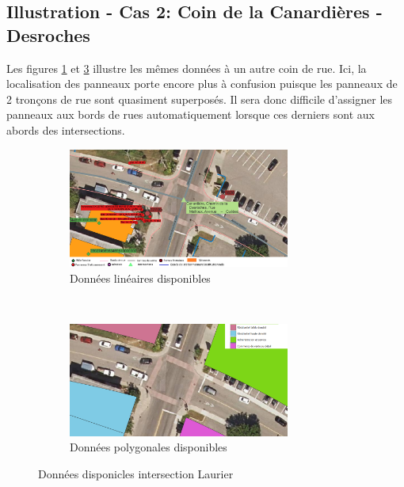 \subsection{Illustration - Cas 2: Coin de la Canardières - Desroches}
Les figures \ref{fig:donnes_panneaux_Desroches} et \ref{fig:donnes_polygone_panneaux_Desroches} illustre les mêmes données à un autre coin de rue. Ici, la localisation des panneaux porte encore plus à confusion puisque les panneaux de 2 tronçons de rue sont quasiment superposés. Il sera donc difficile d'assigner les panneaux aux bords de rues automatiquement lorsque ces derniers sont aux abords des intersections.
\begin{figure}[ht]
  \centering
  \begin{subfigure}{\linewidth}
    \centering
    \includegraphics[width=0.8\textwidth]{images/donnees_disponible_Desroches_legende_v2.png}
  \caption{Données linéaires disponibles}
  \label{fig:donnes_panneaux_Desroches}
  \end{subfigure} \\
  \begin{subfigure}{\linewidth}
    \centering
    \includegraphics[width=0.8\textwidth]{images/utilisation_sols_Desroches_v2.png}
  \caption{Données polygonales disponibles}
  \label{fig:donnes_polygone_panneaux_Desroches}
  \end{subfigure}
  \caption{Données disponicles intersection Laurier}
\end{figure}
\FloatBarrier
